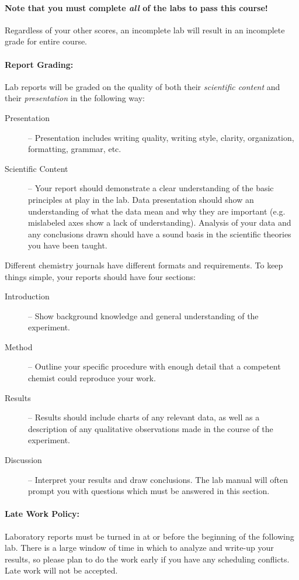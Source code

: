 \documentclass[12pt, letterpaper]{article}
\begin{document}
\paragraph{Note that you must complete \emph{all} of the labs to pass this course!} Regardless of your other scores, an incomplete lab will result in an incomplete grade for entire course.

\paragraph{Report Grading:}
Lab reports will be graded on the quality of both their \emph{scientific content} and their \emph{presentation} in the following way:
\begin{description}
	\item[Presentation] -- Presentation includes writing quality, writing style, clarity, organization, formatting, grammar, etc.

	\item[Scientific Content] -- Your report should demonstrate a clear understanding of the basic principles at play in the lab. Data presentation should show an understanding of what the data mean and why they  are important (e.g. mislabeled axes show a lack of understanding). Analysis of your data and any conclusions drawn should have a sound basis in the scientific theories you have been taught.
\end{description}

Different chemistry journals have different formats and requirements. To keep things simple, your reports should have four sections:
\begin{description}
	\item[Introduction] -- Show background knowledge and general understanding of the experiment.
	\item[Method] -- Outline your specific procedure with enough detail that a competent chemist could reproduce your work.
	\item[Results] -- Results should include charts of any relevant data, as well as a description of any qualitative observations made in the course of the experiment.
	\item[Discussion] -- Interpret your results and draw conclusions. The lab manual will often prompt you with questions which must be answered in this section.
\end{description}

\paragraph{Late Work Policy:}
Laboratory reports must be turned in at or before the beginning of the following lab. There is a large window of time in which to analyze and write-up your results, so please plan to do the work early if you have any scheduling conflicts. Late work will not be accepted.
\end{document}
